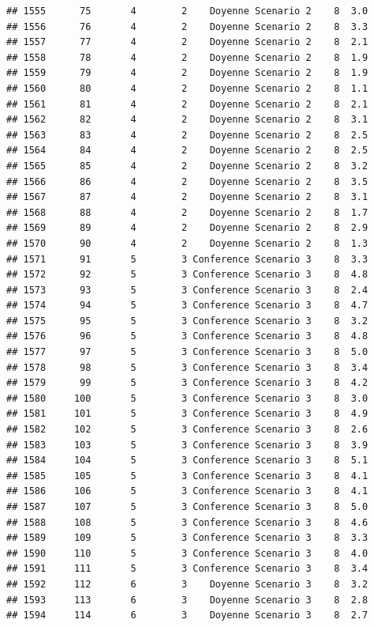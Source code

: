 \documentclass[
]{article}
\begin{document}
\begin{verbatim}
## 1555      75       4        2    Doyenne Scenario 2    8  3.0
## 1556      76       4        2    Doyenne Scenario 2    8  3.3
## 1557      77       4        2    Doyenne Scenario 2    8  2.1
## 1558      78       4        2    Doyenne Scenario 2    8  1.9
## 1559      79       4        2    Doyenne Scenario 2    8  1.9
## 1560      80       4        2    Doyenne Scenario 2    8  1.1
## 1561      81       4        2    Doyenne Scenario 2    8  2.1
## 1562      82       4        2    Doyenne Scenario 2    8  3.1
## 1563      83       4        2    Doyenne Scenario 2    8  2.5
## 1564      84       4        2    Doyenne Scenario 2    8  2.5
## 1565      85       4        2    Doyenne Scenario 2    8  3.2
## 1566      86       4        2    Doyenne Scenario 2    8  3.5
## 1567      87       4        2    Doyenne Scenario 2    8  3.1
## 1568      88       4        2    Doyenne Scenario 2    8  1.7
## 1569      89       4        2    Doyenne Scenario 2    8  2.9
## 1570      90       4        2    Doyenne Scenario 2    8  1.3
## 1571      91       5        3 Conference Scenario 3    8  3.3
## 1572      92       5        3 Conference Scenario 3    8  4.8
## 1573      93       5        3 Conference Scenario 3    8  2.4
## 1574      94       5        3 Conference Scenario 3    8  4.7
## 1575      95       5        3 Conference Scenario 3    8  3.2
## 1576      96       5        3 Conference Scenario 3    8  4.8
## 1577      97       5        3 Conference Scenario 3    8  5.0
## 1578      98       5        3 Conference Scenario 3    8  3.4
## 1579      99       5        3 Conference Scenario 3    8  4.2
## 1580     100       5        3 Conference Scenario 3    8  3.0
## 1581     101       5        3 Conference Scenario 3    8  4.9
## 1582     102       5        3 Conference Scenario 3    8  2.6
## 1583     103       5        3 Conference Scenario 3    8  3.9
## 1584     104       5        3 Conference Scenario 3    8  5.1
## 1585     105       5        3 Conference Scenario 3    8  4.1
## 1586     106       5        3 Conference Scenario 3    8  4.1
## 1587     107       5        3 Conference Scenario 3    8  5.0
## 1588     108       5        3 Conference Scenario 3    8  4.6
## 1589     109       5        3 Conference Scenario 3    8  3.3
## 1590     110       5        3 Conference Scenario 3    8  4.0
## 1591     111       5        3 Conference Scenario 3    8  3.4
## 1592     112       6        3    Doyenne Scenario 3    8  3.2
## 1593     113       6        3    Doyenne Scenario 3    8  2.8
## 1594     114       6        3    Doyenne Scenario 3    8  2.7

\end{verbatim}
\end{document}
